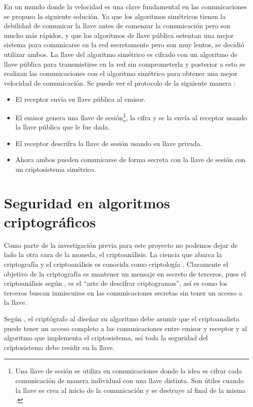 En un mundo donde la velocidad es una clave fundamental en las comunicaciones se propuso la siguiente solución. Ya que los algoritmos simétricos tienen la debilidad de comunicar la llave antes de comenzar la comunicación pero son mucho más rápidos, y que los algoritmos de llave pública ostentan una mejor sistema para comunicarse en la red secretamente pero son muy lentos, se decidió utilizar ambos. La llave del algoritmo simétrico es cifrado con un algoritmo de llave pública para transmistirse en la red sin comprometerla y posterior a esto se realizan las comunicaciones con el algoritmo simétrico para obtener una mejor velocidad de comunicación. Se puede ver el protocolo de la siguiente manera \citep{bruce}:
\begin{itemize}
\item El receptor envía su llave pública al emisor.
\item El emisor genera una llave de sesión\footnote{Una llave de sesión se utiliza en comunicaciones donde la idea es cifrar cada comunicación de manera individual con una llave distinta. Son útiles cuando la llave se crea al inicio de la comunicación y se destruye al final de la misma \citep{bruce}.}, la cifra y se la envía al receptor usando la llave pública que le fue dada.
\item El receptor descrifra la llave de sesión usando su llave privada.
\item Ahora ambos pueden comunicarse de forma secreta con la llave de sesión con un criptosistema simétrico.
\end{itemize}





\section{Seguridad en algoritmos criptográficos}
Como parte de la investigación previa para este proyecto no podemos dejar de lado la otra cara de la moneda, el criptoanálisis. La ciencia que abarca la criptografía y el criptoanálisis es conocida como criptología \citep{denning}. Claramente el objetivo de la criptografía es mantener un mensaje en secreto de terceros, pues el criptoanálisis según \cite{raeCriptoanalisis}, es el ``arte de descifrar criptogramas'', así es como los terceros buscan inmiscuirse en las comunicaciones secretas sin tener un acceso a la llave.  

Según \cite{bruce}, el criptógrafo al diseñar su algoritmo debe asumir que el criptoanalista puede tener un acceso completo a las comunicaciones entre emisor y receptor y al algoritmo que implementa el criptosistema, así toda la seguridad del criptosistema debe residir en la llave.

